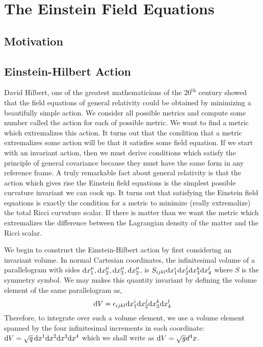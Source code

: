 \documentclass[11pt, a4paper]{article}
\begin{document}
\section{The Einstein Field Equations}

\subsection{Motivation}

\subsection{Einstein-Hilbert Action}

David Hilbert, one of the greatest mathematicians of the $20^{\mathrm{th}}$ century showed that the field equations of general relativity could be obtained by minimizing a beautifully simple action. We consider all possible metrics and compute some number called the action for each of possible metric. We want to find a metric which extremalizes this action. It turns out that the condition that a metric extremalizes some action will be that it satisfies some field equation. If we start with an invariant action, then we must derive conditions which satisfy the principle of general covariance because they must have the same form in any reference frame. A truly remarkable fact about general relativity is that the action which gives rise the Einstein field equations is the simplest possible curvature invariant we can cook up. It turns out that satisfying the Einstein field equations is exactly the condition for a metric to minimize (really extremalize) the total Ricci curvature scalar. If there is matter than we want the metric which extremalizes the difference between the Lagrangian density of the matter and the Ricci scalar.
\par   
We begin to construct the Einstein-Hilbert action by first considering an invariant volume.  In normal Cartesian coordinates, the infinitesimal volume of a parallelogram with sides $\mathrm{d}x_1^\mu, \mathrm{d}x_2^\mu, \mathrm{d}x_3^\mu, \mathrm{d}x_2^\mu$, is $S_{ijkl} \mathrm{d}x_1^i \mathrm{d}x_2^j \mathrm{d}x_3^k \mathrm{d}x_4^l$ where $S$ is the symmetry symbol.  We may makes this quantity invariant by defining the volume element of the same parallelogram as, 
\[\mathrm{d}V = \epsilon_{ijkl} \mathrm{d}x_1^i \mathrm{d}x_2^j \mathrm{d}x_3^k \mathrm{d}x_4^l\]
Therefore, to integrate over such a volume element, we use a volume element spanned by the four infinitesimal increments in each coordinate: $\mathrm{d}V = \sqrt{q} \, \mathrm{d}x^1\mathrm{d}x^2 \mathrm{d}x^3 \mathrm{d}x^4$ which we shall write as $\mathrm{d}V = \sqrt{g} d^4 x$.
\end{document}
